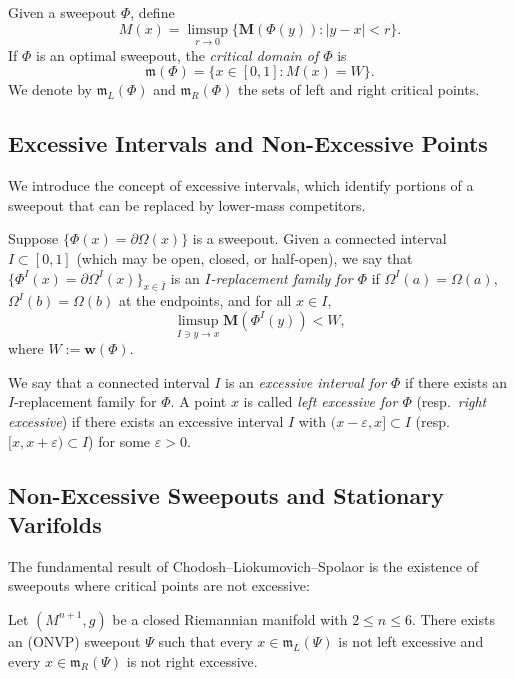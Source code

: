 \begin{definition}\label{def:critical-set}
Given a sweepout $\Phi$, define
\[
M(x) = \limsup_{r \to 0} \{\mathbf{M}(\Phi(y)): |y-x| < r\}.
\]
If $\Phi$ is an optimal sweepout, the \emph{critical domain of $\Phi$} is
\[
\mathfrak{m}(\Phi)=\{ x \in [0,1]: M(x) =W \}.
\]
We denote by $\mathfrak{m}_L(\Phi)$ and $\mathfrak{m}_R(\Phi)$ the sets of left and right critical points.
\end{definition}

\subsection{Excessive Intervals and Non-Excessive Points}

We introduce the concept of excessive intervals, which identify portions of a sweepout that can be replaced by lower-mass competitors.

\begin{definition}\label{def:excessive-interval}
Suppose $\{\Phi(x) = \partial\Omega(x)\}$ is a sweepout. Given a connected interval $I \subset [0,1]$
(which may be open, closed, or half-open), we say that $\{\Phi^I(x) = \partial\Omega^I(x)\}_{x\in \bar{I}}$
is an \emph{$I$-replacement family for $\Phi$} if
$\Omega^I(a) = \Omega(a)$, $\Omega^I(b) = \Omega(b)$ at the endpoints, and for all $x \in I$,
\[
\limsup_{I \ni y \to x} \mathbf{M}(\Phi^I(y)) < W,
\]
where $W := \mathbf{w}(\Phi)$.

We say that a connected interval $I$ is an \emph{excessive interval for $\Phi$} if there exists an $I$-replacement family
for $\Phi$. A point $x$ is called \emph{left excessive for $\Phi$} (resp.\ \emph{right excessive}) if there exists an excessive interval $I$ with
$(x-\varepsilon, x] \subset I$ (resp.\ $[x, x+\varepsilon) \subset I$) for some $\varepsilon > 0$.
\end{definition}

\subsection{Non-Excessive Sweepouts and Stationary Varifolds}\label{subsec:stationary-varifolds-non-excessive}

The fundamental result of Chodosh--Liokumovich--Spolaor is the existence of sweepouts where critical points are not excessive:

\begin{theorem}\label{thm:non-excessive-existence}
Let $(M^{n+1},g)$ be a closed Riemannian manifold with $2\leq n\leq 6$. There exists an (ONVP) sweepout $\Psi$ such that every $x\in \mathfrak{m}_L(\Psi)$ is not left excessive and every $x \in \mathfrak{m}_R(\Psi)$ is not right excessive.
\end{theorem}

